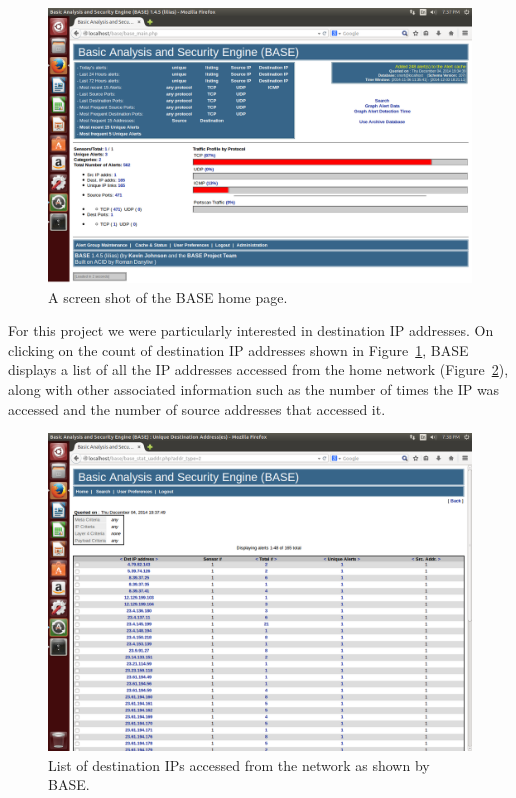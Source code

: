 \begin{figure}[!t]
    \centering
    \includegraphics[width=\columnwidth]{figures/R2_BASE_Main}
    \caption{A screen shot of the BASE home page.}
    \label{fig:r2}
\end{figure}

For this project we were particularly interested in destination IP
addresses.
%
On clicking on the count of destination IP addresses shown in
Figure~\ref{fig:r2}, BASE displays a list of all the IP addresses accessed from
the home network (Figure~\ref{fig:r3}), along with other associated information
such as the number of times the IP was accessed and the number of source
addresses that accessed it.

\begin{figure}[!t]
    \centering
    \includegraphics[width=\columnwidth]{figures/R3_BASE_IPList}
    \caption{List of destination IPs accessed from the network as shown by
    BASE.}
    \label{fig:r3}
\end{figure}

